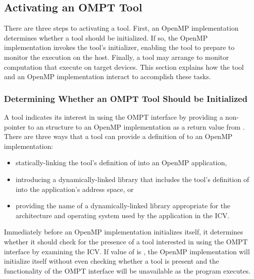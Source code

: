 \subsection{Activating an OMPT Tool}
\label{sec:ompt-initialization}

There are three steps to activating a tool. First, an OpenMP
implementation determines whether a tool should be initialized.  If
so, the OpenMP implementation invokes the tool's initializer, enabling
the tool to prepare to monitor the execution on the host. Finally, a
tool may arrange to monitor computation that execute 
on target devices. This section explains how the tool and an 
OpenMP implementation interact to accomplish these tasks.

\subsubsection{Determining Whether an OMPT Tool Should be Initialized}
\label{sec:ompt-check-tool}

A tool indicates its interest in using the OMPT interface 
by providing a non- pointer to an
structure to an OpenMP implementation as a return value from 
. There are three ways
that a tool can provide a definition of  to an
OpenMP implementation:

\begin{itemize}
\item statically-linking the tool's definition of 
  into an OpenMP application, 
\item introducing a dynamically-linked library that includes the tool's definition
  of  into the application's address space, or 
\item providing the name of a dynamically-linked library appropriate
  for the architecture and operating system used by the application
  in the  ICV.
\end{itemize}

Immediately before an OpenMP implementation initializes itself, it
determines whether it should check for the presence of a tool
interested in using the OMPT interface by examining the 
ICV.  If value of  is , the OpenMP
implementation will initialize itself without even checking whether a
tool is present and the functionality of the OMPT interface will be
unavailable as the program executes.
 
